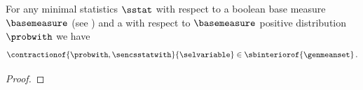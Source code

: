 \begin{theorem}
    \label{the:meanPolytopeInteriorCharacterization}
    For any minimal statistics $\sstat$ with respect to a boolean base measure $\basemeasure$ (see ) and a with respect to $\basemeasure$ positive distribution $\probwith$ we have
    \begin{align*}
        \contractionof{\probwith,\sencsstatwith}{\selvariable} \in \sbinteriorof{\genmeanset} \, .
    \end{align*}
\end{theorem}
\begin{proof}


\end{proof}
